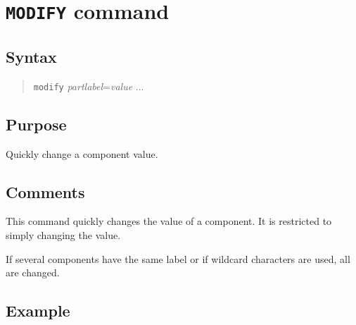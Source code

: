 %
%
%
%
\section{{\tt MODIFY} command}
\subsection{Syntax}
\begin{verse}
{\tt modify} {\it partlabel}={\it value} ...
\end{verse}
\subsection{Purpose}

Quickly change a component value.
\subsection{Comments}

This command quickly changes the value of a component.  It is restricted to
simply changing the value.

If several components have the same label or if wildcard characters are
used, all are changed.
\subsection{Example}


